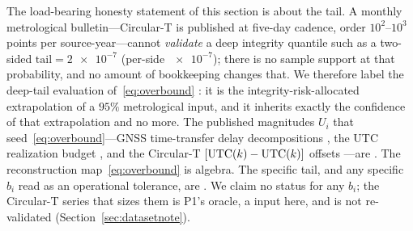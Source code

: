 The load-bearing honesty statement of this section is about the tail. A monthly
metrological bulletin---Circular-T is published at five-day cadence, order
$10^2$--$10^3$ points per source-year---cannot \emph{validate} a deep integrity
quantile such as a two-sided $\mathrm{tail}=\num{2e-7}$ (per-side $\num{e-7}$); there
is no sample support at that
probability, and no amount of bookkeeping changes that. We therefore label the
deep-tail evaluation of~\eqref{eq:overbound} \Modelled{}: it is the
integrity-risk-allocated extrapolation of a \Cited{} $95\%$ metrological input, and
it inherits exactly the confidence of that extrapolation and no more. The published
magnitudes $U_i$ that seed~\eqref{eq:overbound}---GNSS time-transfer delay
decompositions \citep{defraigne2015}, the UTC realization budget
\citep{panfilo2019}, and the Circular-T $[\mathrm{UTC}(k){}-\mathrm{UTC}(k){}]$ offsets
\citep{bipmcirculart}---are \Cited{}. The reconstruction map~\eqref{eq:overbound} is
\Proven{} algebra. The specific tail, and any specific $b_i$ read as an operational
tolerance, are \Modelled{}. We claim no \Validated{} status for any $b_i$; the
Circular-T series that sizes them is P1's oracle, a \Cited{} input here, and is not
re-validated (Section~\ref{sec:datasetnote}).
